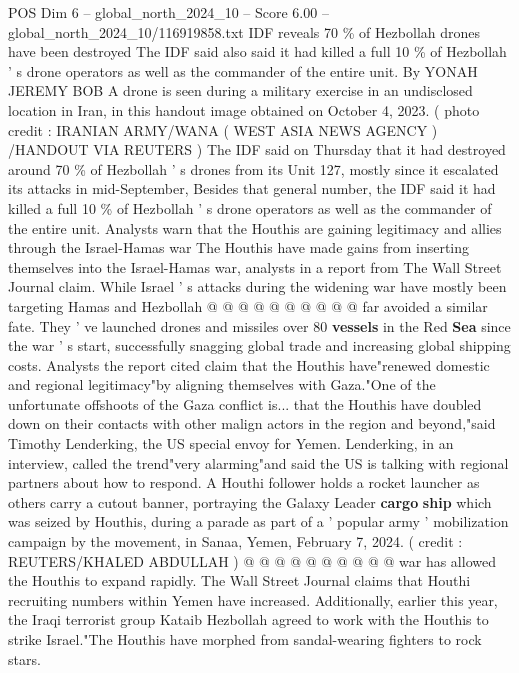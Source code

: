 \begin{textsample}{POS Dim 6 – global\_north\_2024\_10 – Score 6.00 – global\_north\_2024\_10/116919858.txt}  \label{ex:f6_pos_372}
IDF reveals 70 \% of Hezbollah drones have been destroyed The IDF said also said it had killed a full 10 \% of Hezbollah ' s drone operators as well as the commander of the entire unit.
By YONAH JEREMY BOB A drone is seen during a military exercise in an undisclosed location in Iran, in this handout image obtained on October 4, 2023. ( photo credit : IRANIAN ARMY/WANA ( WEST ASIA NEWS AGENCY ) /HANDOUT VIA REUTERS ) The IDF said on Thursday that it had destroyed around 70 \% of Hezbollah ' s drones from its Unit 127, mostly since it escalated its attacks in mid-September, Besides that general number, the IDF said it had killed a full 10 \% of Hezbollah ' s drone operators as well as the commander of the entire unit.
Analysts warn that the Houthis are gaining legitimacy and allies through the Israel-Hamas war The Houthis have made gains from inserting themselves into the Israel-Hamas war, analysts in a report from The Wall Street Journal claim.
While Israel ' s attacks during the widening war have mostly been targeting Hamas and Hezbollah @ @ @ @ @ @ @ @ @ @ far avoided a similar fate.
They ' ve launched drones and missiles over 80 \textbf{vessels} in the Red \textbf{Sea} since the war ' s start, successfully snagging global trade and increasing global shipping costs.
Analysts the report cited claim that the Houthis have"renewed domestic and regional legitimacy"by aligning themselves with Gaza."One of the unfortunate offshoots of the Gaza conflict is... that the Houthis have doubled down on their contacts with other malign actors in the region and beyond,"said Timothy Lenderking, the US special envoy for Yemen.
Lenderking, in an interview, called the trend"very alarming"and said the US is talking with regional partners about how to respond.
A Houthi follower holds a rocket launcher as others carry a cutout banner, portraying the Galaxy Leader \textbf{cargo} \textbf{ship} which was seized by Houthis, during a parade as part of a ' popular army ' mobilization campaign by the movement, in Sanaa, Yemen, February 7, 2024. ( credit : REUTERS/KHALED ABDULLAH ) @ @ @ @ @ @ @ @ @ @ war has allowed the Houthis to expand rapidly.
The Wall Street Journal claims that Houthi recruiting numbers within Yemen have increased.
Additionally, earlier this year, the Iraqi terrorist group Kataib Hezbollah agreed to work with the Houthis to strike Israel."The Houthis have morphed from sandal-wearing fighters to rock stars.

\end{textsample}
